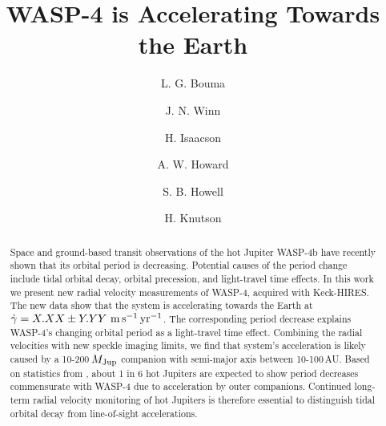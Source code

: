 \documentclass[12pt,twocolumn,tighten]{aastex62}
\begin{document}

\title{WASP-4 is Accelerating Towards the Earth}


%
%
\author[0000-0002-0514-5538]{L. G. Bouma}
%
\author[0000-0002-4265-047X]{J. N. Winn}

%
%
\author[0000-0002-0531-1073]{H. Isaacson}
%
\author[0000-0001-8638-0320]{A. W. Howard}
%
\author{S. B. Howell}
%
\author{H. Knutson}
%
%
%

\begin{abstract}
  Space and ground-based transit observations of the hot Jupiter
  WASP-4b have recently shown that its orbital period is decreasing.
  Potential causes of the period change include tidal orbital decay,
  orbital precession, and light-travel time effects.
  In this work we present new radial velocity measurements of WASP-4,
  acquired with Keck-HIRES.
  The new data show that the system is accelerating towards the Earth
  at $\dot{\gamma} = X.XX \pm Y.YY\ {\rm m}\,{\rm s}^{-1}\,{\rm
  yr}^{-1}$.
  The corresponding period decrease explains WASP-4's
  changing orbital period as a light-travel time effect.
  Combining the radial velocities with new speckle imaging limits, we
  find that system's acceleration is likely caused by a
  10-200$\,M_{\rm Jup}$ companion with semi-major axis between 10-100$\,$AU.
  Based on statistics from \citet{knutson_friends_2014}, about 1 in 6
  hot Jupiters are expected to show period decreases commensurate with
  WASP-4 due to acceleration by outer companions.
  Continued long-term radial velocity monitoring of hot Jupiters is
  therefore essential to distinguish tidal orbital decay from
  line-of-sight accelerations.
\end{abstract}
\end{document}
